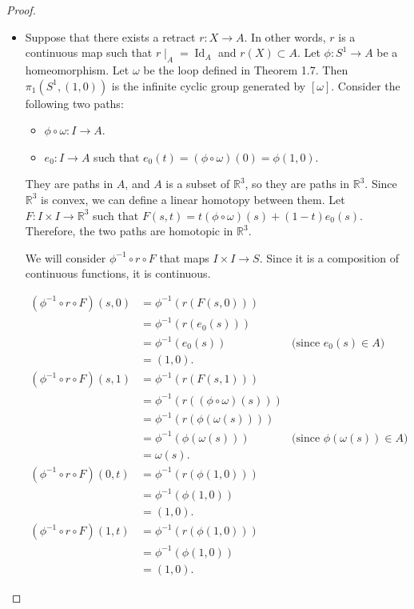 \documentclass[12pt, psamsfonts]{amsart}
\theoremstyle{definition}
\theoremstyle{remark}
\DeclareMathOperator{\Id}{Id}
\numberwithin{equation}{section}
\begin{document}
\begin{proof}
  $ $
  \begin{itemize}
    \item
      Suppose that there exists a retract $r: X \rightarrow A$.
      In other words, $r$ is a continuous map such that $r \mid_A = \Id_A$ and $r(X) \subset A$.
      Let $\phi: S^1 \rightarrow A$ be a homeomorphism.
      Let $\omega$ be the loop defined in Theorem 1.7.
      Then $\pi_1(S^1, (1, 0))$ is the infinite cyclic group generated by $[\omega]$.
      Consider the following two paths:
      \begin{itemize}
        \item
          $\phi \circ \omega: I \rightarrow A$.
        \item
          $e_0: I \rightarrow A$ such that $e_0(t) = (\phi \circ \omega)(0) = \phi(1, 0)$.
      \end{itemize}
      They are paths in $A$, and $A$ is a subset of $\mathbb{R}^3$, so they are paths in $\mathbb{R}^3$.
      Since $\mathbb{R}^3$ is convex, we can define a linear homotopy between them.
      Let $F: I \times I \rightarrow \mathbb{R}^3$ such that $F(s, t) = t(\phi \circ \omega)(s) + (1 - t)e_0(s)$.
      Therefore, the two paths are homotopic in $\mathbb{R}^3$.

      We will consider $\phi^{-1} \circ r \circ F$ that maps $I \times I \rightarrow S$.
      Since it is a composition of continuous functions, it is continuous.

      \begin{align*}
        (\phi^{-1} \circ r \circ F)(s, 0)
          &= \phi^{-1}(r(F(s, 0))) \\
          &= \phi^{-1}(r(e_0(s))) \\
          &= \phi^{-1}(e_0(s)) & \text{(since $e_0(s) \in A$)} \\
          &= (1, 0). \\
        (\phi^{-1} \circ r \circ F)(s, 1)
          &= \phi^{-1}(r(F(s, 1))) \\
          &= \phi^{-1}(r((\phi \circ \omega)(s))) \\
          &= \phi^{-1}(r(\phi(\omega(s)))) \\
          &= \phi^{-1}(\phi(\omega(s))) & \text{(since $\phi(\omega(s)) \in A$)}\\
          &= \omega(s). \\
        (\phi^{-1} \circ r \circ F)(0, t)
          &= \phi^{-1}(r(\phi(1, 0))) \\
          &= \phi^{-1}(\phi(1, 0)) \\
          &= (1, 0). \\
        (\phi^{-1} \circ r \circ F)(1, t)
          &= \phi^{-1}(r(\phi(1, 0))) \\
          &= \phi^{-1}(\phi(1, 0)) \\
          &= (1, 0).
      \end{align*}


\end{itemize}
\end{proof}
\end{document}
